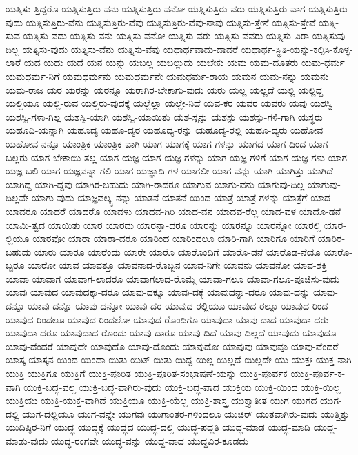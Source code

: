 {ಯತ್ನಿಸು-ತ್ತಿದ್ದರೊ
ಯತ್ನಿಸುತ್ತಿರು-ವನು
ಯತ್ನಿಸುತ್ತಿರು-ವನೋ
ಯತ್ನಿಸುತ್ತಿರು-ವರು
ಯತ್ನಿಸುತ್ತಿರು-ವಾಗ
ಯತ್ನಿಸುತ್ತಿರು-ವುದು
ಯತ್ನಿಸುತ್ತಿರು-ವೆನು
ಯತ್ನಿಸುತ್ತಿರು-ವೆವು
ಯತ್ನಿಸುತ್ತಿರು-ವೆವು-ನಾವು
ಯತ್ನಿಸು-ತ್ತೇನೆ
ಯತ್ನಿಸು-ತ್ತೇವೆ
ಯತ್ನಿ-ಸುವ
ಯತ್ನಿಸು-ವದು
ಯತ್ನಿಸು-ವನು
ಯತ್ನಿಸು-ವನೋ
ಯತ್ನಿಸು-ವರು
ಯತ್ನಿಸು-ವವರು
ಯತ್ನಿಸು-ವಿರಾ
ಯತ್ನಿಸುವು-ದಿಲ್ಲ
ಯತ್ನಿಸು-ವುದು
ಯತ್ನಿಸು-ವೆನು
ಯತ್ನಿಸು-ವೆವು
ಯಥಾರ್ಥವಾದು-ದಾದರೆ
ಯಥಾರ್ಥ-ಸ್ಥಿತಿ-ಯನ್ನು-ಕಲ್ಪಿಸಿ-ಕೊಳ್ಳ-ಲಾರೆ
ಯದ
ಯದು
ಯದೆ
ಯನ
ಯನ್ನು
ಯಬಲ್ಲ
ಯಬಲ್ಲುದು
ಯಬೇಕು
ಯಮ
ಯಮ-ದೂತರು
ಯಮ-ಧರ್ಮ
ಯಮಧರ್ಮ-ನಿಗೆ
ಯಮಧರ್ಮನು
ಯಮಧರ್ಮನೇ
ಯಮಧರ್ಮ-ರಾಯ
ಯಮನ
ಯಮ-ನನ್ನು
ಯಮನು
ಯಮ-ರಾಜ
ಯರ
ಯರನ್ನು
ಯರನ್ನೂ
ಯರಾಗಿರ-ಬೇಕಾಗು-ವುದು
ಯರು
ಯಲ್ಲ
ಯಲ್ಲದೆ
ಯಲ್ಲಿ
ಯಲ್ಲಿದ್ದ
ಯಲ್ಲಿಯೂ
ಯಲ್ಲಿ-ರುವ
ಯಲ್ಲಿರು-ವುದಕ್ಕೆ
ಯಲ್ಲೆಲ್ಲಾ
ಯಲ್ಲೇ-ನಿದೆ
ಯವ-ಕರ
ಯವರ
ಯವರು
ಯವು
ಯಶಸ್ವಿ
ಯಶಸ್ವಿ-ಗಳಾ-ಗಿಲ್ಲ
ಯಶಸ್ವಿ-ಯಾಗಿ
ಯಶಸ್ವಿ-ಯಾಯಿತು
ಯಶ-ಸ್ಸನ್ನು
ಯಶಸ್ಸು
ಯಶಸ್ಸು-ಗಳಿ-ಗಾಗಿ
ಯಸ್ಥರು
ಯಹೂದಿ-ಯನ್ನಾಗಿ
ಯಹೂದ್ಯ
ಯಹೂ-ದ್ಯರ
ಯಹೂದ್ಯ-ರನ್ನು
ಯಹೂದ್ಯ-ರಲ್ಲಿ
ಯಹೂ-ದ್ಯರು
ಯಹೋವ
ಯಹೋವ-ನನ್ನೂ
ಯಾಂತ್ರಿಕ
ಯಾಂತ್ರಿಕ-ವಾಗಿ
ಯಾಗ
ಯಾಗಕ್ಕೆ
ಯಾಗ-ಗಳನ್ನು
ಯಾಗದ
ಯಾಗ-ದಿಂದ
ಯಾಗ-ಬಲ್ಲರು
ಯಾಗ-ಬೇಕಾಯಿ-ತಲ್ಲ
ಯಾಗ-ಯಜ್ಞ
ಯಾಗ-ಯಜ್ಞ-ಗಳನ್ನು
ಯಾಗ-ಯಜ್ಞ-ಗಳಿಗೆ
ಯಾಗ-ಯಜ್ಞ-ಗಳು
ಯಾಗ-ಯಜ್ಞ-ಬಲಿ
ಯಾಗ-ಯಜ್ಞವನ್ನಾ-ಗಲಿ
ಯಾಗ-ಯಜ್ಞಾದಿ-ಗಳ
ಯಾಗಲೀ
ಯಾಗ-ವನ್ನು
ಯಾಗಿ
ಯಾಗಿತ್ತು
ಯಾಗಿದೆ
ಯಾಗಿದ್ದ
ಯಾಗಿ-ದ್ದವು
ಯಾಗಿರ-ಬಹುದು
ಯಾಗಿ-ರಾದರೂ
ಯಾಗುವ
ಯಾಗು-ವನು
ಯಾಗುವು-ದಿಲ್ಲ
ಯಾಗುವು-ದಿಲ್ಲವೇ
ಯಾಗು-ವುದು
ಯಾಜ್ಞವಲ್ಕ್ಯ-ನನ್ನು
ಯಾತನೆ
ಯಾತನೆ-ಯಿಂದ
ಯಾತ್ರೆ
ಯಾತ್ರೆ-ಗಳನ್ನು
ಯಾತ್ರೆಗೆ
ಯಾದ
ಯಾದರೂ
ಯಾದರೆ
ಯಾದರೊ
ಯಾದಳು
ಯಾದವ-ಗಿರಿ
ಯಾದ-ವನ
ಯಾದವ-ರೆಲ್ಲ
ಯಾದ-ವಳ
ಯಾದೊ-ಡನೆ
ಯಾಮಿ-ತ್ವದ
ಯಾಯಿತು
ಯಾರ
ಯಾರದು
ಯಾರನ್ನಾ-ದರೂ
ಯಾರನ್ನು
ಯಾರನ್ನೂ
ಯಾರನ್ನೋ
ಯಾರಲ್ಲಿ
ಯಾರ-ಲ್ಲಿಯೂ
ಯಾರವೋ
ಯಾರಾ
ಯಾರಾ-ದರೂ
ಯಾರಿಂದ
ಯಾರಿಂದಲೂ
ಯಾರಿ-ಗಾಗಿ
ಯಾರಿಗೂ
ಯಾರಿಗೆ
ಯಾರಿರ-ಬಹುದು
ಯಾರು
ಯಾರೂ
ಯಾರೆಂದು
ಯಾರೇ
ಯಾರೊ
ಯಾರೊಂದಿಗೆ
ಯಾರೊ-ಡನೆ
ಯಾರೊಡ-ನೆಯೊ
ಯಾರೊ-ಬ್ಬರೂ
ಯಾರೋ
ಯಾವ
ಯಾವತ್ತೂ
ಯಾವನಾದ-ರೊಬ್ಬನ
ಯಾವ-ನಿಗೇ
ಯಾವನು
ಯಾವನೋ
ಯಾವ-ಶಕ್ತಿ
ಯಾವಾ
ಯಾವಾಗ
ಯಾವಾಗ-ಲಾದರೂ
ಯಾವಾಗಲಾದ-ರೊಮ್ಮೆ
ಯಾವಾ-ಗಲೂ
ಯಾವಾ-ಗಲೂ-ಪೂಜಿಸು-ವುದು
ಯಾವು
ಯಾವುದ
ಯಾವುದಕ್ಕಾ-ದರೂ
ಯಾವು-ದಕ್ಕೂ
ಯಾವು-ದಕ್ಕೆ
ಯಾವುದನ್ನಾ-ದರೂ
ಯಾವು-ದನ್ನು
ಯಾವು-ದನ್ನೂ
ಯಾವು-ದನ್ನೊ
ಯಾವು-ದನ್ನೋ
ಯಾವು-ದರ
ಯಾವುದ-ರಲ್ಲಿಯೂ
ಯಾವುದ-ರಲ್ಲೂ
ಯಾವುದ-ರಿಂದ
ಯಾವುದ-ರಿಂದಲೂ
ಯಾವುದ-ರಿಂದಲೋ
ಯಾವುದ-ರೊಂದಿಗೂ
ಯಾವುದಾ
ಯಾವು-ದಾದ
ಯಾವುದಾ-ದರು
ಯಾವುದಾ-ದರೂ
ಯಾವುದಾದ-ರೊಂದು
ಯಾವು-ದಾರೂ
ಯಾವು-ದಿದೆ
ಯಾವು-ದಿಲ್ಲದೆ
ಯಾವುದು
ಯಾವುದೂ
ಯಾವು-ದೆಂದರೆ
ಯಾವುದೇ
ಯಾವುದೊ
ಯಾವು-ದೊಂದು
ಯಾವುದೋ
ಯಾವುವು
ಯಾವುವೂ
ಯಾವು-ವೆಂದರೆ
ಯಾಸ್ಕ
ಯಾಸ್ಕನ
ಯಿಂದ
ಯಿಂದಾ-ಯಿತು
ಯಿಟ್
ಯಿತು
ಯಿದ್ದ
ಯಿಲ್ಲ
ಯಿಲ್ಲದೆ
ಯಿಲ್ಲದೇ
ಯು
ಯುಕ್ತಃ
ಯುಕ್ತ-ನಾಗಿ
ಯುಕ್ತಿ
ಯುಕ್ತಿಗೂ
ಯುಕ್ತಿಗೆ
ಯುಕ್ತಿ-ಪೂರಿತ
ಯುಕ್ತಿ-ಪೂರಿತ-ಸಂಭಾಷಣೆ-ಯನ್ನು
ಯುಕ್ತಿ-ಪೂರ್ವಕ
ಯುಕ್ತಿ-ಪೂರ್ವ-ಕ-ವಾಗಿ
ಯುಕ್ತಿ-ಬದ್ಧ-ವಲ್ಲ
ಯುಕ್ತಿ-ಬದ್ಧ-ವಾಗಿರು-ವುದು
ಯುಕ್ತಿ-ಬದ್ಧ-ವಾದ
ಯುಕ್ತಿಯ
ಯುಕ್ತಿ-ಯಿಂದ
ಯುಕ್ತಿ-ಯಿಲ್ಲ
ಯುಕ್ತಿಯು
ಯುಕ್ತಿ-ಯುಕ್ತ-ವಾಗಿದೆ
ಯುಕ್ತಿಯೂ
ಯುಕ್ತಿ-ಯೆಲ್ಲ
ಯುಕ್ತಿ-ಶಾಸ್ತ್ರ
ಯುಕ್ತ್ಯಾತೀತ
ಯುಗ
ಯುಗದ
ಯುಗ-ದಲ್ಲಿ
ಯುಗ-ದಲ್ಲಿಯೂ
ಯುಗ-ವನ್ನೇ
ಯುಗವು
ಯುಗಾಂತರ-ಗಳಿಂದಲೂ
ಯುಜಿರ್
ಯುತವಾಗಿರು-ವುದು
ಯುತ್ತಿತ್ತು
ಯುದಿಷ್ಠಿರ-ನಿಗೆ
ಯುದ್ಧ
ಯುದ್ಧಕ್ಕೆ
ಯುದ್ಧದ
ಯುದ್ಧ-ದಲ್ಲಿ
ಯುದ್ಧ-ಪದ್ಧತಿ
ಯುದ್ಧ-ಮಾಡ
ಯುದ್ಧ-ಮಾಡಿ
ಯುದ್ಧ-ಮಾಡು-ವುದು
ಯುದ್ಧ-ರಂಗವೇ
ಯುದ್ಧ-ವನ್ನು
ಯುದ್ಧ-ವಾದ
ಯುದ್ಧವಿರ-ಕೂಡದು
}
